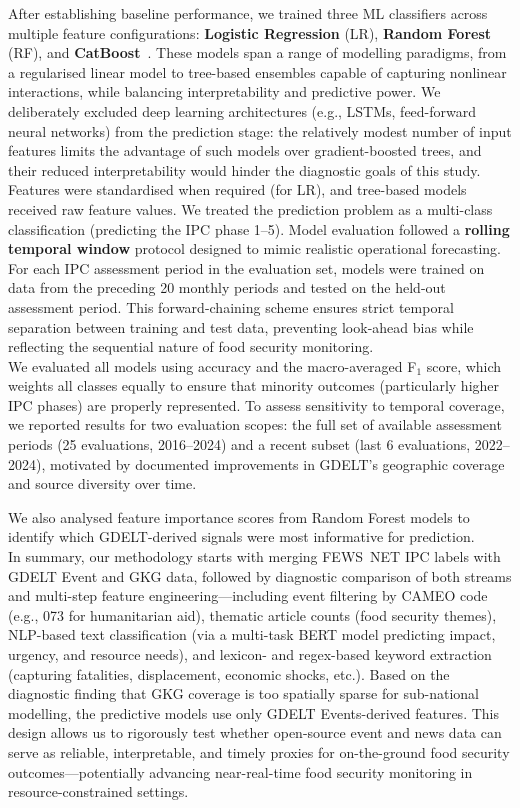 \documentclass{article}
\begin{document}
After establishing baseline performance, we trained three ML classifiers across multiple feature configurations: \textbf{Logistic Regression} (LR), \textbf{Random Forest}~\citep{breiman2001random} (RF), and \textbf{CatBoost}~\citep{dorogush2018catboost}. These models span a range of modelling paradigms, from a regularised linear model to tree-based ensembles capable of capturing nonlinear interactions, while balancing interpretability and predictive power. We deliberately excluded deep learning architectures (e.g., LSTMs, feed-forward neural networks) from the prediction stage: the relatively modest number of input features limits the advantage of such models over gradient-boosted trees, and their reduced interpretability would hinder the diagnostic goals of this study. Features were standardised when required (for LR), and tree-based models received raw feature values. We treated the prediction problem as a multi-class classification (predicting the IPC phase 1--5). Model evaluation followed a \textbf{rolling temporal window} protocol designed to mimic realistic operational forecasting. For each IPC assessment period in the evaluation set, models were trained on data from the preceding 20 monthly periods and tested on the held-out assessment period. This forward-chaining scheme ensures strict temporal separation between training and test data, preventing look-ahead bias while reflecting the sequential nature of food security monitoring.\\

We evaluated all models using accuracy and the macro-averaged F$_1$ score, which weights all classes equally to ensure that minority outcomes (particularly higher IPC phases) are properly represented. To assess sensitivity to temporal coverage, we reported results for two evaluation scopes: the full set of available assessment periods (25 evaluations, 2016--2024) and a recent subset (last 6 evaluations, 2022--2024), motivated by documented improvements in GDELT's geographic coverage and source diversity over time.

We also analysed feature importance scores from Random Forest models to identify which GDELT-derived signals were most informative for prediction.\\

In summary, our methodology starts with merging FEWS~NET IPC labels with GDELT Event and GKG data, followed by diagnostic comparison of both streams and multi-step feature engineering—including event filtering by CAMEO code (e.g., 073 for humanitarian aid), thematic article counts (food security themes), NLP-based text classification (via a multi-task BERT model predicting impact, urgency, and resource needs), and lexicon- and regex-based keyword extraction (capturing fatalities, displacement, economic shocks, etc.). Based on the diagnostic finding that GKG coverage is too spatially sparse for sub-national modelling, the predictive models use only GDELT Events-derived features. This design allows us to rigorously test whether open-source event and news data can serve as reliable, interpretable, and timely proxies for on-the-ground food security outcomes—potentially advancing near-real-time food security monitoring in resource-constrained settings.
\end{document}
